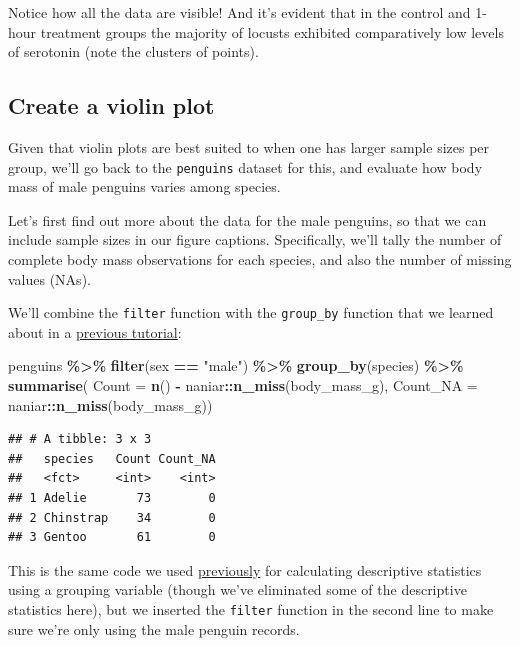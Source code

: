 \documentclass[
]{book}
\newenvironment{Shaded}{\begin{snugshade}}{\end{snugshade}}
\newcommand{\AttributeTok}[1]{\textcolor[rgb]{0.13,0.29,0.53}{#1}}
\newcommand{\FunctionTok}[1]{\textcolor[rgb]{0.13,0.29,0.53}{\textbf{#1}}}
\newcommand{\NormalTok}[1]{#1}
\newcommand{\SpecialCharTok}[1]{\textcolor[rgb]{0.81,0.36,0.00}{\textbf{#1}}}
\newcommand{\StringTok}[1]{\textcolor[rgb]{0.31,0.60,0.02}{#1}}
\begin{document}
Notice how all the data are visible! And it's evident that in the control and 1-hour treatment groups the majority of locusts exhibited comparatively low levels of serotonin (note the clusters of points).

\subsection{Create a violin plot}\label{violinplot}

Given that violin plots are best suited to when one has larger sample sizes per group, we'll go back to the \texttt{penguins} dataset for this, and evaluate how body mass of male penguins varies among species.

Let's first find out more about the data for the male penguins, so that we can include sample sizes in our figure captions. Specifically, we'll tally the number of complete body mass observations for each species, and also the number of missing values (NAs).

We'll combine the \texttt{filter} function with the \texttt{group\_by} function that we learned about in a \hyperref[desc_numeric_var_cat]{previous tutorial}:

\begin{Shaded}
\begin{Highlighting}[]
\NormalTok{penguins }\SpecialCharTok{\%\textgreater{}\%}
  \FunctionTok{filter}\NormalTok{(sex }\SpecialCharTok{==} \StringTok{"male"}\NormalTok{) }\SpecialCharTok{\%\textgreater{}\%}
  \FunctionTok{group\_by}\NormalTok{(species) }\SpecialCharTok{\%\textgreater{}\%}
  \FunctionTok{summarise}\NormalTok{(}
    \AttributeTok{Count =} \FunctionTok{n}\NormalTok{() }\SpecialCharTok{{-}}\NormalTok{ naniar}\SpecialCharTok{::}\FunctionTok{n\_miss}\NormalTok{(body\_mass\_g),}
    \AttributeTok{Count\_NA =}\NormalTok{ naniar}\SpecialCharTok{::}\FunctionTok{n\_miss}\NormalTok{(body\_mass\_g))}
\end{Highlighting}
\end{Shaded}

\begin{verbatim}
## # A tibble: 3 x 3
##   species   Count Count_NA
##   <fct>     <int>    <int>
## 1 Adelie       73        0
## 2 Chinstrap    34        0
## 3 Gentoo       61        0
\end{verbatim}

This is the same code we used \hyperref[desc_numeric_var_cat]{previously} for calculating descriptive statistics using a grouping variable (though we've eliminated some of the descriptive statistics here), but we inserted the \texttt{filter} function in the second line to make sure we're only using the male penguin records.
\end{document}
